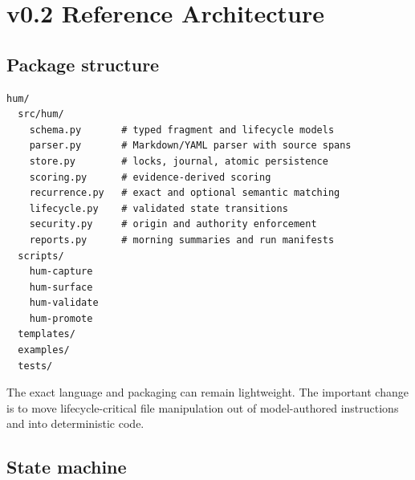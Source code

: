 \documentclass[11pt,a4paper]{article}
\begin{document}
\section{v0.2 Reference Architecture}

\subsection{Package structure}

\begin{lstlisting}[language={}]
hum/
  src/hum/
    schema.py       # typed fragment and lifecycle models
    parser.py       # Markdown/YAML parser with source spans
    store.py        # locks, journal, atomic persistence
    scoring.py      # evidence-derived scoring
    recurrence.py   # exact and optional semantic matching
    lifecycle.py    # validated state transitions
    security.py     # origin and authority enforcement
    reports.py      # morning summaries and run manifests
  scripts/
    hum-capture
    hum-surface
    hum-validate
    hum-promote
  templates/
  examples/
  tests/
\end{lstlisting}

The exact language and packaging can remain lightweight. The important change is to move lifecycle-critical file manipulation out of model-authored instructions and into deterministic code.

\subsection{State machine}
\end{document}

